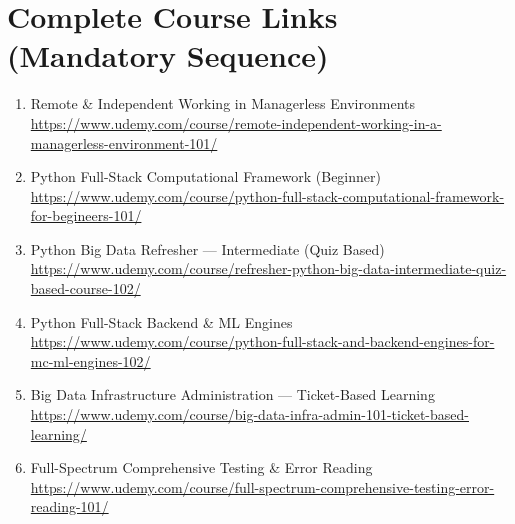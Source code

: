 \documentclass[12pt]{article}
\begin{document}
	
	
	\newpage
	
\section*{Complete Course Links (Mandatory Sequence)}

\begin{enumerate}[label=\textbf{Course \arabic*:}]
	\item Remote \& Independent Working in Managerless Environments \\
	\href{https://www.udemy.com/course/remote-independent-working-in-a-managerless-environment-101/}
	{https://www.udemy.com/course/remote-independent-working-in-a-managerless-environment-101/}
	
	\item Python Full-Stack Computational Framework (Beginner) \\
	\href{https://www.udemy.com/course/python-full-stack-computational-framework-for-begineers-101/}
	{https://www.udemy.com/course/python-full-stack-computational-framework-for-begineers-101/}
	
	\item Python Big Data Refresher — Intermediate (Quiz Based) \\
	\href{https://www.udemy.com/course/refresher-python-big-data-intermediate-quiz-based-course-102/}
	{https://www.udemy.com/course/refresher-python-big-data-intermediate-quiz-based-course-102/}
	
	\item Python Full-Stack Backend \& ML Engines \\
	\href{https://www.udemy.com/course/python-full-stack-and-backend-engines-for-mc-ml-engines-102/}
	{https://www.udemy.com/course/python-full-stack-and-backend-engines-for-mc-ml-engines-102/}
	
	\item Big Data Infrastructure Administration — Ticket-Based Learning \\
	\href{https://www.udemy.com/course/big-data-infra-admin-101-ticket-based-learning/}
	{https://www.udemy.com/course/big-data-infra-admin-101-ticket-based-learning/}
	
	\item Full-Spectrum Comprehensive Testing \& Error Reading \\
	\href{https://www.udemy.com/course/full-spectrum-comprehensive-testing-error-reading-101/}
	{https://www.udemy.com/course/full-spectrum-comprehensive-testing-error-reading-101/}
	

\end{enumerate}
\end{document}

